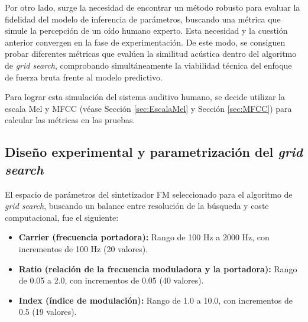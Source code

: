 Por otro lado, surge la necesidad de encontrar un método robusto para evaluar la fidelidad del modelo de inferencia de parámetros, buscando una métrica
que simule la percepción de un oído humano experto. Esta necesidad y la cuestión anterior convergen en la fase de experimentación.
De este modo, se consiguen probar diferentes métricas que evalúen la similitud acústica dentro del algoritmo de \textit{grid search}, comprobando
simultáneamente la viabilidad técnica del enfoque de fuerza bruta frente al modelo predictivo.

Para lograr esta simulación del sistema auditivo humano, se decide utilizar la escala Mel y MFCC (véase Sección \ref{sec:EscalaMel} y Sección \ref{sec:MFCC}) para calcular las métricas en las pruebas.



\subsection{Diseño experimental y parametrización del \textit{grid search}}
El espacio de parámetros del sintetizador FM seleccionado para el algoritmo de \textit{grid search}, buscando un balance entre resolución de la búsqueda y 
coste computacional, fue el siguiente: 

\begin{itemize}
    \item \textbf{Carrier (frecuencia portadora):} Rango de 100 Hz a 2000 Hz, con incrementos de 100 Hz (20 valores).
    \item \textbf{Ratio (relación de la frecuencia moduladora y la portadora):} Rango de 0.05 a 2.0, con incrementos de 0.05 (40 valores).
    \item \textbf{Index (índice de modulación):} Rango de 1.0 a 10.0, con incrementos de 0.5 (19 valores).
\end{itemize}

